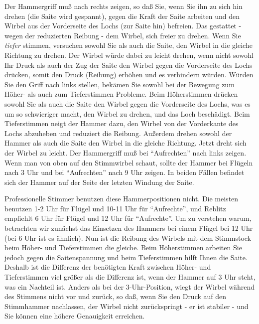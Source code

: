 Der Hammergriff muß nach rechts zeigen, so daß Sie, wenn Sie ihn zu sich hin drehen (die Saite wird gespannt), gegen die Kraft der Saite arbeiten und den Wirbel aus der Vorderseite des Lochs (zur Saite hin) befreien.
 Das gestattet - wegen der reduzierten Reibung - dem Wirbel, sich freier zu drehen.
 Wenn Sie \textit{tiefer} stimmen, versuchen sowohl Sie als auch die Saite, den Wirbel in die gleiche Richtung zu drehen.
 Der Wirbel würde dabei zu leicht drehen, wenn nicht sowohl Ihr Druck als auch der Zug der Saite den Wirbel gegen die Vorderseite des Lochs drücken, somit den Druck (Reibung) erhöhen und es verhindern würden.
 Würden Sie den Griff nach links stellen, bekämen Sie sowohl bei der Bewegung zum Höher- als auch zum Tieferstimmen Probleme.
 Beim Höherstimmen drücken sowohl Sie als auch die Saite den Wirbel gegen die Vorderseite des Lochs, was es um so schwieriger macht, den Wirbel zu drehen, und das Loch beschädigt.
 Beim Tieferstimmen neigt der Hammer dazu, den Wirbel von der Vorderkante des Lochs abzuheben und reduziert die Reibung.
 Außerdem drehen sowohl der Hammer als auch die Saite den Wirbel in die gleiche Richtung.
 Jetzt dreht sich der Wirbel zu leicht.
 Der Hammergriff muß bei \enquote{Aufrechten} nach links zeigen.
 Wenn man von oben auf den Stimmwirbel schaut, sollte der Hammer bei Flügeln nach 3 Uhr und bei \enquote{Aufrechten} nach 9 Uhr zeigen.
 In beiden Fällen befindet sich der Hammer auf der Seite der letzten Windung der Saite.
 

Professionelle Stimmer benutzen diese Hammerpositionen nicht.
 Die meisten benutzen 1-2 Uhr für Flügel und 10-11 Uhr für \enquote{Aufrechte}, und Reblitz empfiehlt 6 Uhr für Flügel und 12 Uhr für \enquote{Aufrechte}.
 Um zu verstehen warum, betrachten wir zunächst das Einsetzen des Hammers bei einem Flügel bei 12 Uhr (bei 6 Uhr ist es ähnlich).
 Nun ist die Reibung des Wirbels mit dem Stimmstock beim Höher- und Tieferstimmen die gleiche.
 Beim Höherstimmen arbeiten Sie jedoch gegen die Saitenspannung und beim Tieferstimmen hilft Ihnen die Saite.
 Deshalb ist die Differenz der benötigten Kraft zwischen Höher- und Tieferstimmen viel größer als die Differenz ist, wenn der Hammer auf 3 Uhr steht, was ein Nachteil ist.
 Anders als bei der 3-Uhr-Position, wiegt der Wirbel während des Stimmens nicht vor und zurück, so daß, wenn Sie den Druck auf den Stimmhammer nachlassen, der Wirbel nicht zurückspringt - er ist stabiler - und Sie können eine höhere Genauigkeit erreichen.
 

